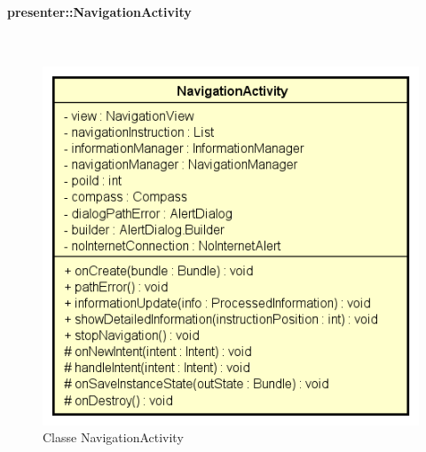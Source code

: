\documentclass[../DefinizioneDiProdotto.tex]{subfiles}
\begin{document}
\paragraph{presenter::NavigationActivity}
\
\begin{figure}[H]
	\centering
	\includegraphics[width=\maxwidth]{img/NavigationActivity.png}
	\caption{Classe NavigationActivity}\label{fig:presenter::NavigationActivity} 
\end{figure}
\end{document}
